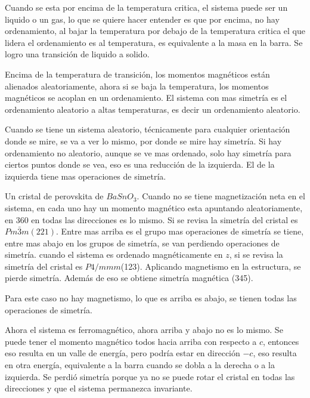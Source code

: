 \documentclass[11pt,fleqn]{book}
\begin{document}

Cuando se esta por encima de la temperatura critica, el sistema puede ser un liquido o un gas, lo que se quiere hacer entender es que por encima, no hay ordenamiento, al bajar la temperatura por debajo de la temperatura critica el que lidera el ordenamiento es al temperatura, es equivalente a la masa en la barra. Se logro una transición de liquido  a solido.

Encima de la temperatura de transición, los momentos magnéticos están alienados aleatoriamente, ahora si se baja la temperatura, los momentos magnéticos se acoplan en un ordenamiento. El sistema con mas simetría es el ordenamiento aleatorio a altas temperaturas, es decir un ordenamiento aleatorio. 

Cuando se tiene un sistema aleatorio, técnicamente para cualquier orientación donde se mire, se va a ver lo mismo, por donde se mire hay simetría. Si hay ordenamiento no aleatorio, aunque se ve mas ordenado, solo hay simetría para ciertos puntos donde se vea, eso es una reducción de la izquierda. El de la izquierda tiene mas operaciones de simetría. 



Un cristal de perovskita de $BaSnO_{3}$. Cuando no se tiene magnetización neta en el sistema, en cada uno hay un momento magnético esta apuntando aleatoriamente, en 360 en todas las direcciones es lo mismo. Si se revisa la simetría del cristal es $Pm\bar{3}m(221)$. Entre mas arriba es el grupo mas operaciones de simetría se tiene, entre mas abajo en los grupos de simetría, se van perdiendo operaciones de simetría. cuando el sistema es ordenado magnéticamente en $z$, si se revisa la simetría del cristal es $P4/mmm$(123). Aplicando magnetismo en la estructura, se pierde simetría. Además de eso se obtiene simetría magnética (345).



Para este caso no hay magnetismo, lo que es arriba es abajo, se tienen todas las operaciones de simetría.


Ahora el sistema es ferromagnético, ahora arriba y abajo no es lo mismo. Se puede tener el momento magnético todos hacia arriba  con respecto a $c$, entonces eso resulta en un valle de energía, pero podría estar en dirección $-c$, eso resulta en otra energía, equivalente a la barra cuando se dobla a la derecha o a la izquierda. Se perdió simetría porque ya no se puede rotar el cristal en todas las direcciones y que el sistema permanezca invariante. 
\end{document}
